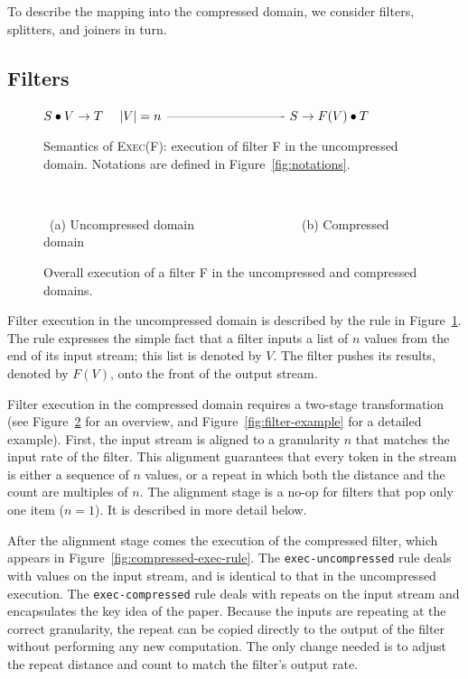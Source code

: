To describe the mapping into the compressed domain, we consider
filters, splitters, and joiners in turn.

\subsection{Filters}

\begin{figure}[t]
$S \bullet V \rightarrow T~~~~|V|=n$ \skiptopb
---------------------------- \skipbot
$S \rightarrow F(V) \bullet T$
\caption{Semantics of \textsc{Exec(F)}: execution of filter F in the
uncompressed domain.  Notations are defined in Figure~\ref{fig:notations}.
\protect\label{fig:exec-rule}}
\end{figure}

\begin{figure}[t]
~~~~~~~~~

\mbox{~}(a) Uncompressed domain~~~~~~~~~~~~~~~~~(b) Compressed domain
\caption{Overall execution of a filter F in the uncompressed and compressed domains.
\protect\label{fig:actor-pic}}
\end{figure}

Filter execution in the uncompressed domain is described by the rule
in Figure~\ref{fig:exec-rule}.  The rule expresses the simple fact
that a filter inputs a list of $n$ values from the end of its input
stream; this list is denoted by $V$.  The filter pushes its results,
denoted by $F(V)$, onto the front of the output stream.

Filter execution in the compressed domain requires a two-stage
transformation (see Figure~\ref{fig:actor-pic} for an overview, and
Figure~\ref{fig:filter-example} for a detailed example).  First, the
input stream is aligned to a granularity $n$ that matches the input
rate of the filter.  This alignment guarantees that every token in the
stream is either a sequence of $n$ values, or a repeat in which both
the distance and the count are multiples of $n$.  The alignment stage
is a no-op for filters that pop only one item ($n=1$).  It is
described in more detail below.

After the alignment stage comes the execution of the compressed
filter, which appears in Figure~\ref{fig:compressed-exec-rule}.  The
{\tt exec-uncompressed} rule
deals with values on the input stream, and is identical to that in the
uncompressed execution.  The {\tt exec-compressed} rule deals with
repeats on the input stream and encapsulates the key idea of the
paper.  Because the inputs are repeating at the correct granularity,
the repeat can be copied directly to the output of the filter without
performing any new computation.  The only change needed is to adjust
the repeat distance and count to match the filter's output rate.


